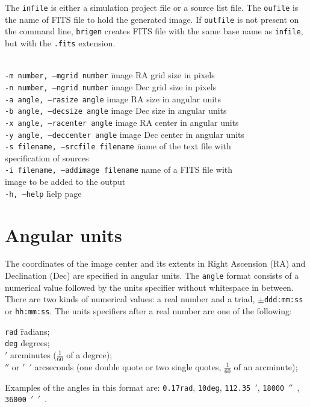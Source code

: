 \documentclass[letterpaper, oneside, 11pt]{article}
\begin{document}
The {\tt infile} is either a simulation project file or a source list file. The {\tt oufile} is the name of FITS file to hold the generated image. If {\tt outfile} is not present on the command line, {\tt brigen} creates FITS file with the same base name as {\tt infile}, but with the {\tt .fits} extension.
\begin{tabbing}
\\
{\tt -m number, --mgrid number}  \hspace{5mm} \= image RA  grid size in pixels \\
{\tt -n number, --ngrid number}  \>image Dec grid size in pixels \\
{\tt -a angle, --rasize angle}  \>image RA  size in angular units \\
{\tt -b angle, --decsize angle}  \>image Dec size in angular units \\
{\tt -x angle, --racenter angle}  \>image RA  center in angular units \\
{\tt -y angle, --deccenter angle}  \>image Dec center in angular units \\
{\tt -s filename, --srcfile filename}  \> \hspace{7mm} 
                    \=name of the text file with \\
                    \>\> specification of sources \\
{\tt -i filename, --addimage filename} \>\>name of a FITS file with \\
                    \>\>image to be added to the output \\
{\tt -h, --help}  \hspace{5mm} \= help page \\
\end{tabbing}

\section{Angular units}

The coordinates of the image center and its extents in Right Ascension (RA) and Declination (Dec) are specified in angular units. The {\tt angle} format consists of a numerical value followed by the units specifier without whitespace in between. There are two kinds of numerical values: a real number and a triad, {\tt $\pm$ddd:mm:ss} or {\tt hh:mm:ss}. The units specifiers after a real number are one of the following:

\begin{tabbing}
{\tt rad}  \hspace{5mm} \= radians; \\
{\tt deg}  \> degrees; \\
{\tt $'$}  \> arcminutes ($\frac{1}{60}$ of a degree); \\
{\tt $''$} or {\tt $'$ $'$}  \> arcseconds (one double quote or two single quotes, $\frac{1}{60}$ of an arcminute); 
\end{tabbing}  
Examples of the angles in this format are: {\tt 0.17rad}, {\tt 10deg}, {\tt 112.35~$'$}, {\tt 18000~$''$ }, {\tt 36000~$'$ $'$ }. \\
\end{document}
